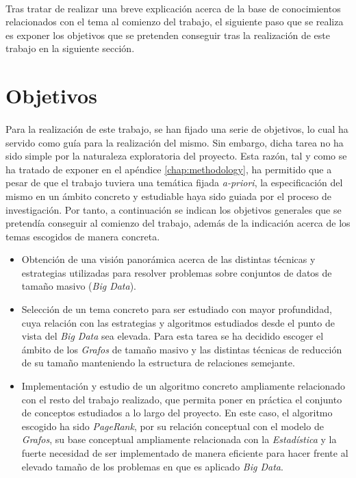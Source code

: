\documentclass{subfiles}
\begin{document}
      \paragraph{}
      Tras tratar de realizar una breve explicación acerca de la base de conocimientos relacionados con el tema al comienzo del trabajo, el siguiente paso que se realiza es exponer los objetivos que se pretenden conseguir tras la realización de este trabajo en la siguiente sección.

    \section{Objetivos}
    \label{sec:introduction_goals}

      \paragraph{}
      Para la realización de este trabajo, se han fijado una serie de objetivos, lo cual ha servido como guía para la realización del mismo. Sin embargo, dicha tarea no ha sido simple por la naturaleza exploratoria del proyecto. Esta razón, tal y como se ha tratado de exponer en el apéndice \ref{chap:methodology}, ha permitido que a pesar de que el trabajo tuviera una temática fijada \emph{a-priori}, la especificación del mismo en un ámbito concreto y estudiable haya sido guiada por el proceso de investigación. Por tanto, a continuación se indican los objetivos generales que se pretendía conseguir al comienzo del trabajo, además de la indicación acerca de los temas escogidos de manera concreta.

      \begin{itemize}

        \item Obtención de una visión panorámica acerca de las distintas técnicas y estrategias utilizadas para resolver problemas sobre conjuntos de datos de tamaño masivo (\emph{Big Data}).

        \item Selección de un tema concreto para ser estudiado con mayor profundidad, cuya relación con las estrategias y algoritmos estudiados desde el punto de vista del \emph{Big Data} sea elevada. Para esta tarea se ha decidido escoger el ámbito de los \emph{Grafos} de tamaño masivo y las distintas técnicas de reducción de su tamaño manteniendo la estructura de relaciones semejante.

        \item Implementación y estudio de un algoritmo concreto ampliamente relacionado con el resto del trabajo realizado, que permita poner en práctica el conjunto de conceptos estudiados a lo largo del proyecto. En este caso, el algoritmo escogido ha sido \emph{PageRank}, por su relación conceptual con el modelo de \emph{Grafos}, su base conceptual ampliamente relacionada con la \emph{Estadística} y la fuerte necesidad de ser implementado de manera eficiente para hacer frente al elevado tamaño de los problemas en que es aplicado \emph{Big Data}.

      \end{itemize}
\end{document}
